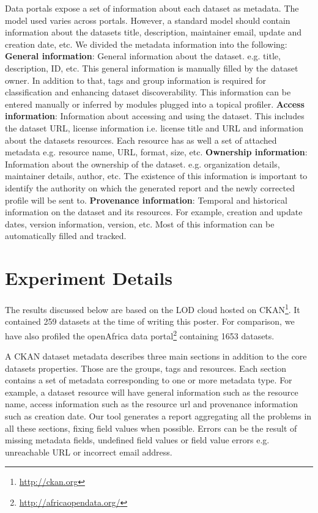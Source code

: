 \documentclass{../../Tools/LaTEX/sig-alternate}
\begin{document}
Data portals expose a set of information about each dataset as metadata. The model used varies across portals. However, a standard model should contain information about the datasets title, description, maintainer email, update and creation date, etc. We divided the metadata information into the following:
\textbf{General information}: General information about the dataset. e.g. title, description, ID, etc. This general information is manually filled by the dataset owner. In addition to that, tags and group information is required for classification and enhancing dataset discoverability. This information can be entered manually or inferred by modules plugged into a topical profiler.
\textbf{Access information}: Information about accessing and using the dataset. This includes the dataset URL, license information i.e. license title and URL and information about the datasets resources. Each resource has as well a set of attached metadata e.g. resource name, URL, format, size, etc.
\textbf{Ownership information}: Information about the ownership of the dataset. e.g. organization details, maintainer details, author, etc. The existence of this information is important to identify the authority on which the generated report and the newly corrected profile will be sent to.
\textbf{Provenance information}: Temporal and historical information on the dataset and its resources. For example, creation and update dates, version information, version, etc. Most of this information can be automatically filled and tracked.


\section{Experiment Details}
The results discussed below are based on the LOD cloud hosted on CKAN\footnote{\url{http://ckan.org}}. It contained 259 datasets at the time of writing this poster. For comparison, we have also profiled the openAfrica data portal\footnote{\url{http://africaopendata.org/}} containing 1653 datasets.

A CKAN dataset metadata describes three main sections in addition to the core datasets properties. Those are the groups, tags and resources. Each section contains a set of metadata corresponding to one or more metadata type. For example, a dataset resource will have general information such as the resource name, access information such as the resource url and provenance information such as creation date. Our tool generates a report aggregating all the problems in all these sections, fixing field values when possible. Errors can be the result of missing metadata fields, undefined field values or field value errors e.g. unreachable URL or incorrect email address.
\end{document}

